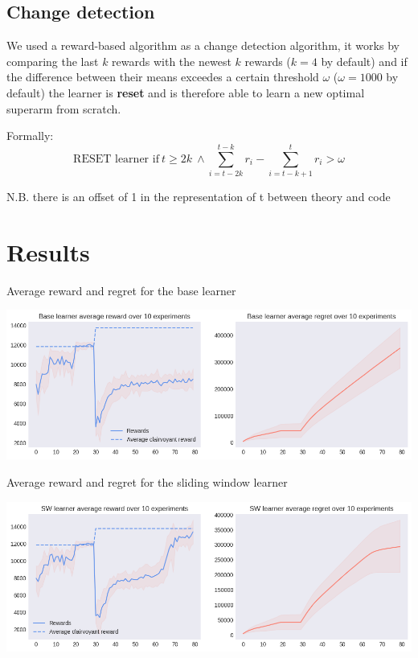 \subsection{Change detection}

We used a reward-based algorithm as a change detection algorithm, it works by comparing the last $k$ rewards with the newest $k$ rewards ($k=4$ by default) and if the difference between their means exceedes a certain threshold $\omega$ ($\omega=1000$ by default) the learner is \textbf{reset} and is therefore able to learn a new optimal superarm from scratch.

Formally:
\begin{displaymath}
    \text{RESET learner if} ~ t \geq 2k ~ \land \sum_{i=t-2k}^{t-k} r_i -\sum_{i=t-k+1}^t r_i > \omega
\end{displaymath}

{\scriptsize N.B. there is an offset of 1 in the representation of t between theory and code}

\section{Results}
\label{sec:ns_demand_res}

Average reward and regret for the base learner

\begin{center}
    \includegraphics[scale=0.5]{img/Graphs/non_stationary/image1.png}
\end{center}

\clearpage %

Average reward and regret for the sliding window learner

\begin{center}
    \includegraphics[scale=0.5]{img/Graphs/non_stationary/image2.png}
\end{center}

